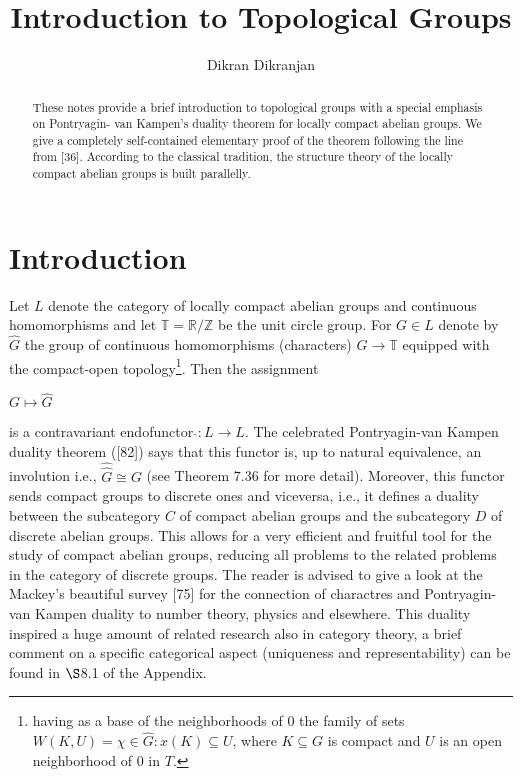 \documentclass[12pt]{article}
\title{Introduction to Topological Groups}
\author{Dikran Dikranjan}
\begin{document}
\maketitle

\begin{abstract}
    These notes provide a brief introduction to topological groups with a special emphasis on Pontryagin-
van Kampen's duality theorem for locally compact abelian groups. We give a completely self-contained 
elementary proof of the theorem following the line from [36]. According to the classical tradition, the
structure theory of the locally compact abelian groups is built parallelly.
\end{abstract}

\section{Introduction}


    Let $L$ denote the category of locally compact abelian groups and continuous homomorphisms and let $ \mathbb{T} = \mathbb{R} / \mathbb{Z} $
be the unit circle group. For $G \in L$ denote by $ \widehat{G} $ the group of continuous homomorphisms (characters) $ G \to \mathbb{T} $
equipped with the compact-open topology\footnote[1]{having as a base of the neighborhoods of 0 the family of sets $ W(K, U) = {\chi \in \widehat{G} : x(K) \subseteq U} $, where $ K \subseteq G $ is compact and
$U$ is an open neighborhood of 0 in $T$.}. Then the assignment


$G \mapsto \widehat{G}$


is a contravariant endofunctor $ \widehat{}: L \to L $. The celebrated Pontryagin-van Kampen duality theorem ([82]) says
that this functor is, up to natural equivalence, an involution i.e., $ \widehat{\widehat{G}} \cong G $ (see Theorem 7.36 for more detail).
Moreover, this functor sends compact groups to discrete ones and viceversa, i.e., it defines a duality between
the subcategory $ C $ of compact abelian groups and the subcategory $ D $ of discrete abelian groups. This allows for
a very efficient and fruitful tool for the study of compact abelian groups, reducing all problems to the related
problems in the category of discrete groups. The reader is advised to give a look at the Mackey's beautiful
survey [75] for the connection of charactres and Pontryagin-van Kampen duality to number theory, physics and
elsewhere. This duality inspired a huge amount of related research also in category theory, a brief comment on
a specific categorical aspect (uniqueness and representability) can be found in $ \S $8.1 of the Appendix.
\end{document}
